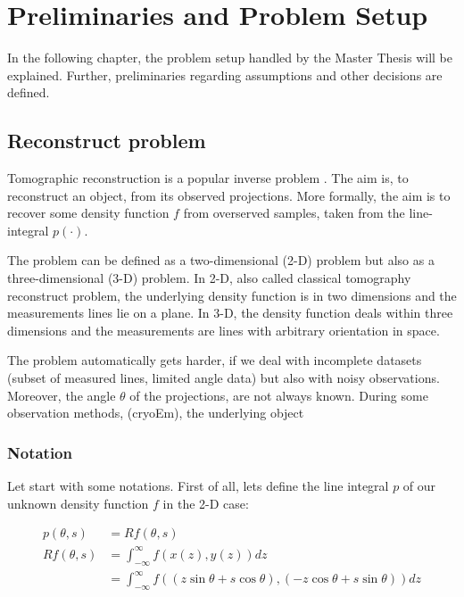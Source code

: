 \chapter{Preliminaries and Problem Setup}
\label{sec:preliminariesProblem}


In the following chapter, the problem setup handled by the Master Thesis will be explained.
Further, preliminaries regarding assumptions and other decisions are defined.

\section{Reconstruct problem}
Tomographic reconstruction is a popular inverse problem \cite{tomographicReconstruction}. 
The aim is, to reconstruct an object, from its observed projections.
More formally, the aim is to recover some density function $f$ from overserved samples, taken from the line-integral $p(\cdot)$.

The problem can be defined as a two-dimensional (2-D) problem but also as a three-dimensional (3-D) problem.
In 2-D, also called classical tomography reconstruct problem,  the underlying density function is in two dimensions and the measurements lines lie on a plane.
In 3-D, the density function deals within three dimensions and the measurements are lines with arbitrary orientation in space.


The problem automatically gets harder, if we deal with incomplete datasets (subset of measured lines, limited angle data) but also with noisy observations.
Moreover, the angle $\theta$ of the projections, are not always known. During some observation methods, (cryoEm), the underlying object

\subsection{Notation}

Let start with some notations. First of all, lets define the line integral $p$ of our unknown density function $f$ in the 2-D case:

\begin{equation}
    \begin{aligned}
        p(\theta, s)   &=  R f(\theta, s) \\
        R f(\theta, s) &=  \int_{-\infty}^{\infty} f(x(z), y(z)) dz \\
                       &= \int_{-\infty}^{\infty} f((z \sin \theta + s \cos \theta), (-z \cos \theta + s \sin \theta)) dz \\
    \end{aligned}
\end{equation}

